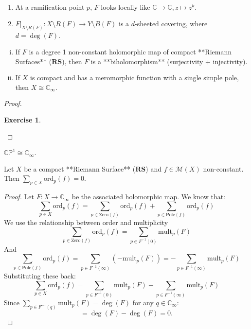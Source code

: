 \documentclass{article}
\newtheorem{exercise}{Exercise}
\begin{document}
\begin{remark}
\begin{enumerate}
    \item At a ramification point $p$, $F$ looks locally like $\mathbb{C} \to \mathbb{C}, z \mapsto z^k$.
    \item $F|_{X \setminus R(F)}: X \setminus R(F) \to Y \setminus B(F)$ is a $d$-sheeted covering, where $d = \deg(F)$.
\end{enumerate}
\end{remark}

\begin{corollary}
\begin{enumerate}[i)]
    \item If $F$ is a degree 1 non-constant holomorphic map of compact **Riemann Surfaces** ($\mathbf{RS}$), then $F$ is a **biholomorphism** (surjectivity + injectivity).
    \item If $X$ is compact and has a meromorphic function with a single simple pole, then $X \cong \mathbb{C}_{\infty}$.
\end{enumerate}
\end{corollary}

\begin{proof}
    \begin{exercise}
        
    \end{exercise}
\end{proof}

\begin{corollary}
$\mathbb{C}\mathbb{P}^1 \cong \mathbb{C}_{\infty}$.
\end{corollary}

\begin{corollary}
Let $X$ be a compact **Riemann Surface** ($\mathbf{RS}$) and $f \in \mathcal{M}(X)$ non-constant.
Then $\sum_{p \in X} \text{ord}_p(f) = 0$.
\end{corollary}

\begin{proof}
Let $F: X \to \mathbb{C}_{\infty}$ be the associated holomorphic map.
We know that:
$$
\sum_{p \in X} \text{ord}_p(f) = \sum_{p \in \text{Zero}(f)} \text{ord}_p(f) + \sum_{p \in \text{Pole}(f)} \text{ord}_p(f)
$$
We use the relationship between order and multiplicity
$$
\sum_{p \in \text{Zero}(f)} \text{ord}_p(f) = \sum_{p \in F^{-1}(0)} \text{mult}_p(F)
$$
And
$$
\sum_{p \in \text{Pole}(f)} \text{ord}_p(f) = \sum_{p \in F^{-1}(\infty)} (-\text{mult}_p(F)) = -\sum_{p \in F^{-1}(\infty)} \text{mult}_p(F)
$$
Substituting these back:
$$
\sum_{p \in X} \text{ord}_p(f) = \sum_{p \in F^{-1}(0)} \text{mult}_p(F) - \sum_{p \in F^{-1}(\infty)} \text{mult}_p(F)
$$
Since $\sum_{p \in F^{-1}(q)} \text{mult}_p(F) = \deg(F)$ for any $q \in \mathbb{C}_{\infty}$:
$$
= \deg(F) - \deg(F) = 0.
$$
\end{proof}
\end{document}
